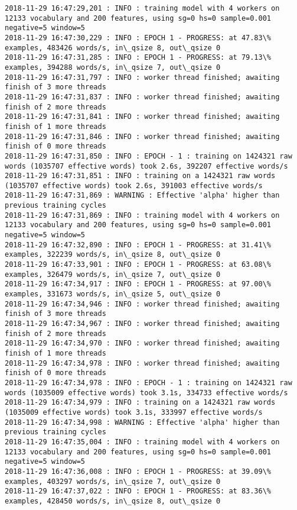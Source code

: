 \documentclass[11pt]{article}
\begin{document}
\begin{Verbatim}[commandchars=\\\{\}]
2018-11-29 16:47:29,201 : INFO : training model with 4 workers on 12133 vocabulary and 200 features, using sg=0 hs=0 sample=0.001 negative=5 window=5
2018-11-29 16:47:30,229 : INFO : EPOCH 1 - PROGRESS: at 47.83\% examples, 483426 words/s, in\_qsize 8, out\_qsize 0
2018-11-29 16:47:31,285 : INFO : EPOCH 1 - PROGRESS: at 79.13\% examples, 394288 words/s, in\_qsize 7, out\_qsize 0
2018-11-29 16:47:31,797 : INFO : worker thread finished; awaiting finish of 3 more threads
2018-11-29 16:47:31,837 : INFO : worker thread finished; awaiting finish of 2 more threads
2018-11-29 16:47:31,841 : INFO : worker thread finished; awaiting finish of 1 more threads
2018-11-29 16:47:31,846 : INFO : worker thread finished; awaiting finish of 0 more threads
2018-11-29 16:47:31,850 : INFO : EPOCH - 1 : training on 1424321 raw words (1035707 effective words) took 2.6s, 392207 effective words/s
2018-11-29 16:47:31,851 : INFO : training on a 1424321 raw words (1035707 effective words) took 2.6s, 391003 effective words/s
2018-11-29 16:47:31,869 : WARNING : Effective 'alpha' higher than previous training cycles
2018-11-29 16:47:31,869 : INFO : training model with 4 workers on 12133 vocabulary and 200 features, using sg=0 hs=0 sample=0.001 negative=5 window=5
2018-11-29 16:47:32,890 : INFO : EPOCH 1 - PROGRESS: at 31.41\% examples, 322239 words/s, in\_qsize 8, out\_qsize 0
2018-11-29 16:47:33,901 : INFO : EPOCH 1 - PROGRESS: at 63.08\% examples, 326479 words/s, in\_qsize 7, out\_qsize 0
2018-11-29 16:47:34,917 : INFO : EPOCH 1 - PROGRESS: at 97.00\% examples, 331673 words/s, in\_qsize 5, out\_qsize 0
2018-11-29 16:47:34,946 : INFO : worker thread finished; awaiting finish of 3 more threads
2018-11-29 16:47:34,967 : INFO : worker thread finished; awaiting finish of 2 more threads
2018-11-29 16:47:34,970 : INFO : worker thread finished; awaiting finish of 1 more threads
2018-11-29 16:47:34,978 : INFO : worker thread finished; awaiting finish of 0 more threads
2018-11-29 16:47:34,978 : INFO : EPOCH - 1 : training on 1424321 raw words (1035009 effective words) took 3.1s, 334733 effective words/s
2018-11-29 16:47:34,979 : INFO : training on a 1424321 raw words (1035009 effective words) took 3.1s, 333997 effective words/s
2018-11-29 16:47:34,998 : WARNING : Effective 'alpha' higher than previous training cycles
2018-11-29 16:47:35,004 : INFO : training model with 4 workers on 12133 vocabulary and 200 features, using sg=0 hs=0 sample=0.001 negative=5 window=5
2018-11-29 16:47:36,008 : INFO : EPOCH 1 - PROGRESS: at 39.09\% examples, 403297 words/s, in\_qsize 7, out\_qsize 0
2018-11-29 16:47:37,022 : INFO : EPOCH 1 - PROGRESS: at 83.36\% examples, 428450 words/s, in\_qsize 8, out\_qsize 0

\end{Verbatim}
\end{document}
